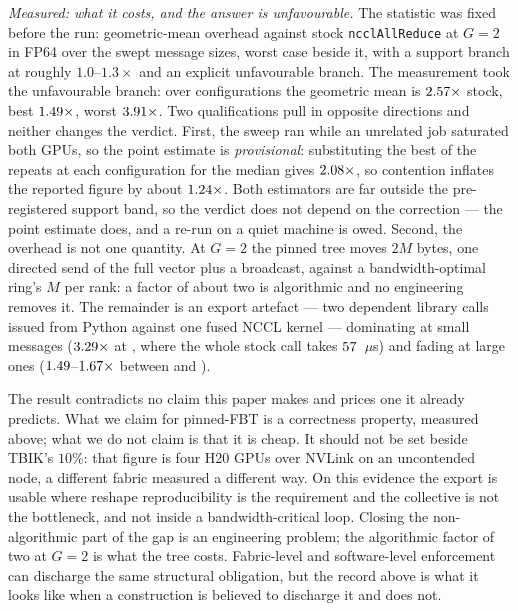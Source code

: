 \documentclass[journal,10pt]{IEEEtran}
\theoremstyle{plain}
\theoremstyle{definition}
\theoremstyle{remark}
\begin{document}
\emph{Measured: what it costs, and the answer is unfavourable.} The statistic
was fixed before the run: geometric-mean overhead against stock
\texttt{ncclAllReduce} at $G{=}2$ in FP64 over the swept message sizes, worst
case beside it, with a support branch at roughly $1.0$--$1.3\times$ and an
explicit unfavourable branch. The measurement took the unfavourable branch:
over \PinCostCells{} configurations the geometric mean is $2.57\times$
stock, best $1.49\times$, worst $3.91\times$. Two
qualifications pull in opposite directions and neither changes the verdict.
First, the sweep ran while an unrelated job saturated both GPUs, so the point
estimate is \emph{provisional}: substituting the best of the repeats at each
configuration for the median gives $2.08\times$, so contention
inflates the reported figure by about $1.24\times$. Both estimators
are far outside the pre-registered support band, so the verdict does not
depend on the correction --- the point estimate does, and a re-run on a quiet
machine is owed. Second, the overhead is not one quantity. At $G{=}2$ the
pinned tree moves $2M$ bytes, one directed send of the full vector plus a
broadcast, against a bandwidth-optimal ring's $M$ per rank: a factor of about
two is algorithmic and no engineering removes it. The remainder is an export
artefact --- two dependent library calls issued from Python against one fused
NCCL kernel --- dominating at small messages ($3.29\times$ at
\PinSmallSize{}, where the whole stock call takes $57$~$\mu$s) and
fading at large ones ($1.49$--$1.67\times$ between
\PinLargeSizeLo{} and \PinLargeSizeHi{}).

The result contradicts no claim this paper makes and prices one it already
predicts. What we claim for pinned-FBT is a correctness property, measured
above; what we do not claim is that it is cheap. It should not be set beside
TBIK's $10\%$: that figure is four H20 GPUs over NVLink on an uncontended
node, a different fabric measured a different way. On this evidence the export
is usable where reshape reproducibility is the requirement and the collective
is not the bottleneck, and not inside a bandwidth-critical loop. Closing the
non-algorithmic part of the gap is an engineering problem; the algorithmic
factor of two at $G{=}2$ is what the tree costs. Fabric-level and
software-level enforcement can discharge the same structural obligation, but
the record above is what it looks like when a construction is believed to
discharge it and does not.
\end{document}

